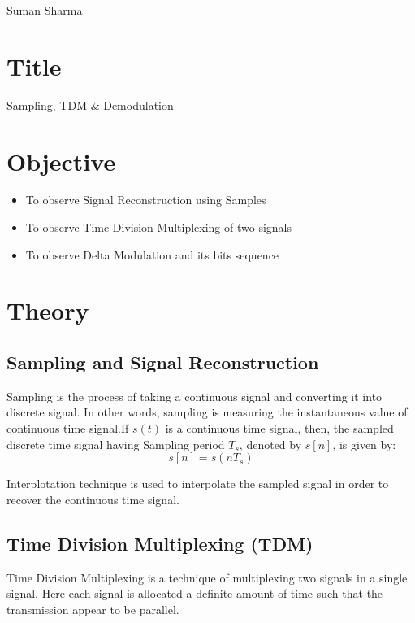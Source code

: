 \documentclass[a4paper,11pt]{article}
\begin{document}
{Suman Sharma}

\renewcommand{\contentsname}{Table of Contents}
\tableofcontents

\pagebreak
\lstlistoflistings
\vspace{10em}
\listoffigures
\pagebreak
{}

\section{Title} {\large Sampling, TDM \& Demodulation}
\section{Objective}
\begin{itemize}
    \item To observe Signal Reconstruction using Samples
    \item To observe Time Division Multiplexing of two signals
    \item To observe Delta Modulation and its bits sequence
\end{itemize}

\section{Theory}
\subsection{Sampling and Signal Reconstruction}
Sampling is the process of taking a continuous signal and converting it into discrete signal. In other words, sampling is measuring the instantaneous value of continuous time signal.If $s(t)$ is a continuous time signal, then, the sampled discrete time signal having Sampling period $T_s$, denoted by $s[n]$,
is given by:
\begin{equation*}
    s[n] = s( nT_s )
\end{equation*}

Interplotation technique is used to interpolate the sampled signal in order to recover the continuous time signal.

\subsection{Time Division Multiplexing (TDM)}
Time Division Multiplexing is a technique of multiplexing two signals in a single signal. Here each signal is allocated a definite amount of time such that the transmission appear to be parallel.
\end{document}
